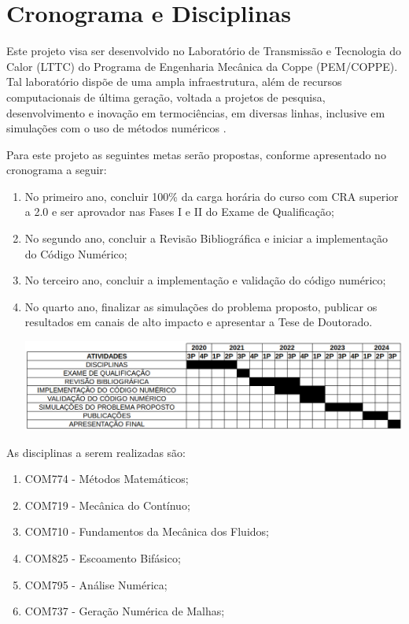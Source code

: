 \section{Cronograma e Disciplinas}

Este projeto visa ser desenvolvido no Laboratório de Transmissão e Tecnologia do Calor (LTTC) do Programa de Engenharia Mecânica da Coppe (PEM/COPPE). 
Tal laboratório dispõe de uma ampla infraestrutura, 
além de recursos computacionais de última geração, 
voltada a projetos de pesquisa, desenvolvimento e inovação
em termociências, em diversas linhas, 
inclusive em simulações com o uso de métodos numéricos \cite{lttccoppe}. 

\bigskip
Para este projeto as seguintes metas serão propostas, conforme apresentado no cronograma a seguir:

\begin{enumerate}

\item No primeiro ano, concluir 100\% da carga horária do curso com CRA superior a 2.0 e ser aprovador nas Fases I e II do Exame de Qualificação;

\item No segundo ano, concluir a Revisão Bibliográfica e iniciar a implementação do Código Numérico;

\item No terceiro ano, concluir a implementação e validação do código numérico;

\item No quarto ano, finalizar as simulações do problema proposto, publicar os resultados em canais de alto impacto e apresentar a Tese de Doutorado.

\vspace{0.8cm}
\hspace{-1.2cm}
\includegraphics[scale=0.44]{figure/cronograma.png}

\end{enumerate}

\bigskip
As disciplinas a serem realizadas são:

\begin{enumerate}
\item COM774 - Métodos Matemáticos; 
\item COM719 - Mecânica do Contínuo;
\item COM710 - Fundamentos da Mecânica dos Fluidos;
\item COM825 - Escoamento Bifásico;
\item COM795 - Análise Numérica;
\item COM737 - Geração Numérica de Malhas;
\end{enumerate}

